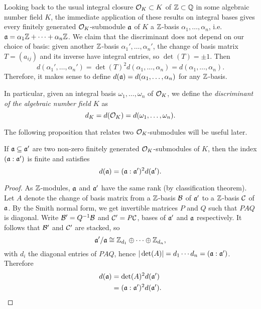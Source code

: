 Looking back to the usual integral closure $\mathcal{O}_K\subset K$ of $\mathbb{Z}\subset\mathbb{Q}$ in some algebraic number field $K$, the immediate application of these results on integral bases gives every finitely generated $\mathcal{O}_K$-submodule $\mathfrak{a}$ of $K$ a $\mathbb{Z}$-basis $\alpha_1,\dots,\alpha_n$, i.e. $\mathfrak{a} = \alpha_1\mathbb{Z}+\cdots+\alpha_n\mathbb{Z}$. We claim that the discriminant does not depend on our choice of basis: given another $\mathbb{Z}$-basis $\alpha_1',\dots,\alpha_n'$, the change of basis matrix $T=(a_{ij})$ and its inverse have integral entries, so $\det(T) = \pm 1$. Then
\[
	d(\alpha_1',\dots,\alpha_n') = \det(T)^2 d(\alpha_1,\dots,\alpha_n) = d(\alpha_1,\dots,\alpha_n).
\]
Therefore, it makes sense to define $d(\mathfrak{a})=d(\alpha_1,\dots,\alpha_n)$ for any $\mathbb{Z}$-basis.

In particular, given an integral basis $\omega_1,\dots,\omega_n$ of $\mathcal{O}_K$, we define the \emph{discriminant of the algebraic number field $K$} as
\[
	d_K = d(\mathcal{O}_K) = d(\omega_1,\dots,\omega_n).
\]


The following proposition that relates two $\mathcal{O}_K$-submodules will be useful later.

\begin{prop}[Neukirch 2.12]
	If $\mathfrak{a}\subseteq\mathfrak{a}'$ are two non-zero finitely generated $\mathcal{O}_K$-submodules of $K$, then the index $(\mathfrak{a}:\mathfrak{a}')$ is finite and satisfies
	\[
		d(\mathfrak{a}) = (\mathfrak{a}:\mathfrak{a}')^2 d(\mathfrak{a}').
	\]
\end{prop}
\begin{proof}
	As $\mathbb{Z}$-modules, $\mathfrak{a}$ and $\mathfrak{a}'$ have the same rank (by classification theorem). Let $A$ denote the change of basis matrix from a $\mathbb{Z}$-basis $\mathcal{B}$ of $\mathfrak{a}'$ to a $\mathbb{Z}$-basis $\mathcal{C}$ of $\mathfrak{a}$. By the Smith normal form, we get invertible matrices $P$ and $Q$ such that $PAQ$ is diagonal. Write $\mathcal{B}'=Q^{-1}\mathcal{B}$ and $\mathcal{C}'=P\mathcal{C}$, bases of $\mathfrak{a}'$ and $\mathfrak{a}$ respectively. It follows that $\mathcal{B}'$ and $\mathcal{C}'$ are stacked, so
	\[
		\mathfrak{a}'/\mathfrak{a} \cong \mathbb{Z}_{d_1} \oplus \cdots \oplus \mathbb{Z}_{d_n},
	\]
	with $d_i$ the diagonal entries of $PAQ$, hence $|\det(A)|=d_1\cdots d_n=(\mathfrak{a}:\mathfrak{a}')$. Therefore
	\begin{align*}
		d(\mathfrak{a}) &= \det(A)^2 d(\mathfrak{a}')\\
			&= (\mathfrak{a}:\mathfrak{a}')^2 d(\mathfrak{a}').
	\end{align*}
\end{proof}
